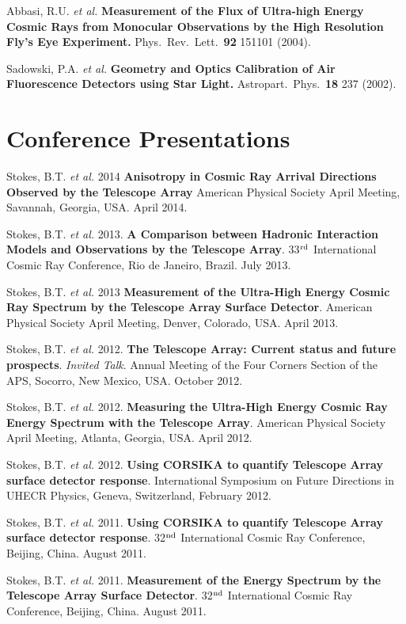 \begin{resume}
Abbasi, R.U. {\it et al.}  {\bf Measurement of the Flux of Ultra-high Energy 
Cosmic Rays from Monocular Observations by the High Resolution Fly's Eye 
Experiment.}  Phys.\ Rev.\ Lett.\ {\bf 92} 151101 (2004). 

Sadowski, P.A. {\it et al.} {\bf Geometry and Optics Calibration of Air 
Fluorescence Detectors using Star Light.}  Astropart.\ Phys.\ {\bf 18} 237 
(2002).

\section{\sc Conference Presentations}

Stokes, B.T. {\it et al.} 2014 {\bf  Anisotropy in Cosmic Ray Arrival Directions Observed by the Telescope Array} American Physical Society April Meeting, Savannah, Georgia, USA. April 2014.

Stokes, B.T. {\it et al.} 2013. {\bf A Comparison between Hadronic Interaction Models and Observations by the Telescope Array}. 33$^{\rm rd}$ International Cosmic Ray Conference, Rio de Janeiro, Brazil. July 2013.

Stokes, B.T. {\it et al.} 2013 {\bf Measurement of the Ultra-High Energy Cosmic Ray Spectrum by the Telescope Array Surface Detector}. American Physical Society April Meeting, Denver, Colorado, USA. April 2013.

Stokes, B.T. {\it et al.} 2012. {\bf The Telescope Array: Current status and future prospects}.  {\it Invited Talk}. Annual Meeting of the Four Corners Section of the APS, Socorro, New Mexico, USA. October 2012.

Stokes, B.T. {\it et al.} 2012. {\bf Measuring the Ultra-High Energy Cosmic Ray Energy Spectrum with the Telescope Array}. American Physical Society April Meeting, Atlanta, Georgia, USA. April 2012. 

Stokes, B.T. {\it et al.} 2012. {\bf Using CORSIKA to quantify Telescope 
Array surface detector response}. International Symposium on Future Directions
in UHECR Physics, Geneva, Switzerland, February 2012.

Stokes, B.T. {\it et al.} 2011. {\bf Using CORSIKA to quantify Telescope 
Array surface detector response}. 32$^{\rm nd}$ International Cosmic Ray 
Conference, Beijing, China. August 2011.

Stokes, B.T. {\it et al.} 2011. {\bf Measurement of the Energy Spectrum by the 
Telescope Array Surface Detector}. 32$^{\rm nd}$ International Cosmic Ray 
Conference, Beijing, China. August 2011.


\end{resume}
